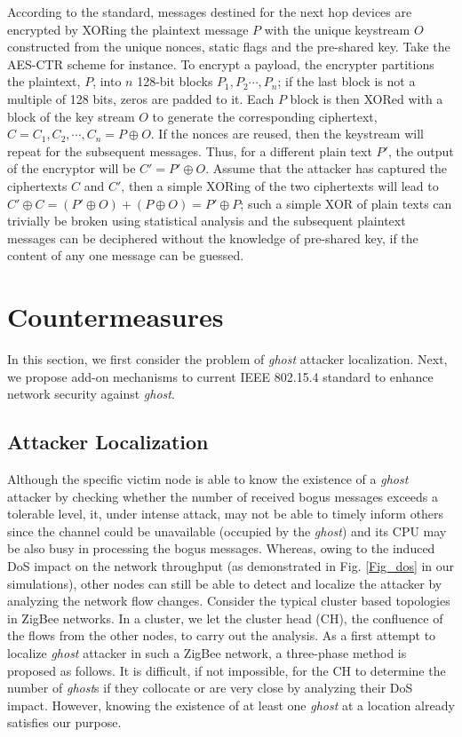\documentclass[10pt,journal,cspaper,compsoc]{IEEEtran}
\begin{document}
According to the standard, messages destined for the next hop devices are encrypted by XORing the plaintext message $P$ with the unique keystream $O$ constructed from the unique nonces, static flags and the pre-shared key. Take the AES-CTR scheme for instance. To encrypt a payload, the encrypter partitions the plaintext, $P$, into $n$ 128-bit blocks ${P_1, P_2 \cdots, P_n}$; if the last block is not a multiple of 128 bits, zeros are padded to it. Each $P$ block is then XORed with a block of the key stream $O$ to generate the corresponding ciphertext, $C={C_1, C_2, \cdots, C_n}=P\oplus O$. If the nonces are reused, then the keystream will repeat for the subsequent messages. Thus, for a different plain text $P'$, the output of the encryptor will be $C'=P' \oplus O$. Assume that the attacker has captured the ciphertexts $C$ and $C'$, then a simple XORing of the two ciphertexts will lead to $C' \oplus C = (P' \oplus O) +(P \oplus O) = P' \oplus P$; such a simple XOR of plain texts can trivially be broken using statistical analysis and the subsequent plaintext messages can be deciphered without the knowledge of pre-shared key,  if the content of any one message can be guessed.

\section{Countermeasures}\label{sec:countermeasures}
In this section, we first consider the problem of {\em ghost} attacker localization. Next, we propose add-on mechanisms to current IEEE 802.15.4 standard to enhance network security against {\em ghost}.

\subsection{Attacker Localization}\label{sec:localizaiton}
Although the specific victim node is able to know the existence of a {\em ghost} attacker by checking whether the number of received bogus messages exceeds a tolerable level, it, under intense attack, may not be able to timely inform others since the channel could be unavailable (occupied by the {\em ghost}) and its CPU may be also busy in processing the bogus messages. Whereas, owing to the induced DoS impact on the network throughput (as demonstrated in Fig. \ref{Fig_dos} in our simulations), other nodes can still be able to detect and localize the attacker by analyzing the network flow changes. Consider the typical cluster based topologies in ZigBee networks. In a cluster, we let the cluster head (CH), the confluence of the flows from the other nodes, to carry out the analysis. As a first attempt to localize {\em ghost} attacker in such a ZigBee network, a three-phase method is proposed as follows. It is difficult, if not impossible, for the CH to determine the number of {\em ghost}s if they collocate or are very close by analyzing their DoS impact. However, knowing the existence of at least one {\em ghost} at a location already satisfies our purpose.
\end{document}
